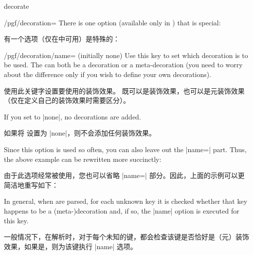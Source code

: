 \begin{pathoperation}{decorate}{}
\begin{key}{/pgf/decoration=}
        There is one option (available only in \tikzname) that is special:
        
        有一个选项（仅在\tikzname 中可用）是特殊的：

        \begin{key}{/pgf/decoration/name= (initially none)}
            Use this key to set which decoration is to be used. The 
            can both be a decoration or a meta-decoration (you need to worry
            about the difference only if you wish to define your own
            decorations).

            使用此关键字设置要使用的装饰效果。  既可以是装饰效果，也可以是元装饰效果（仅在定义自己的装饰效果时需要区分）。



            If you set  to |none|, no decorations are added.
            
            如果将  设置为 |none|，则不会添加任何装饰效果。

\begin{codeexample}[preamble={\usetikzlibrary{decorations.pathmorphing}}]
\end{codeexample}
            Since this option is used so often, you can also leave out the
            |name=| part. Thus, the above example can be rewritten more
            succinctly:

            由于此选项经常被使用，您也可以省略 |name=| 部分。因此，上面的示例可以更简洁地重写如下：

\begin{codeexample}[preamble={\usetikzlibrary{decorations.pathmorphing}}]
\end{codeexample}
            In general, when  are parsed, for each
            unknown key it is checked whether that key happens to be a
            (meta-)decoration and, if so, the |name| option is executed for
            this key.

            一般情况下，在解析时，对于每个未知的键，都会检查该键是否恰好是（元）装饰效果，如果是，则为该键执行 |name| 选项。



\end{key}
\end{key}
\end{pathoperation}
